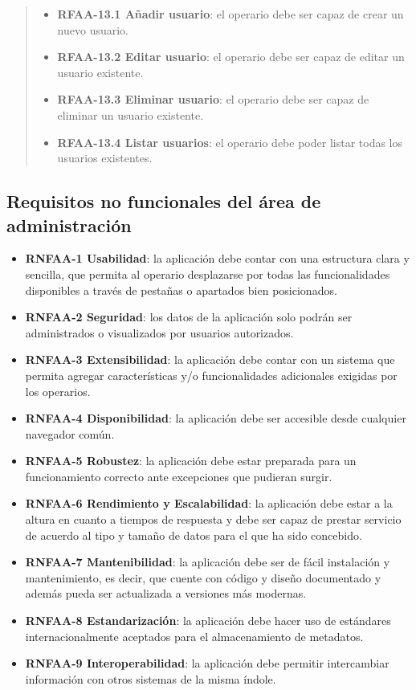 \begin{itemize}
  \begin{quote}
  \begin{itemize}
  \tightlist
  \item
    \textbf{RFAA-13.1 Añadir usuario}: el operario debe ser capaz de
    crear un nuevo usuario.
  \item
    \textbf{RFAA-13.2 Editar usuario}: el operario debe ser capaz de
    editar un usuario existente.
  \item
    \textbf{RFAA-13.3 Eliminar usuario}: el operario debe ser capaz de
    eliminar un usuario existente.
  \item
    \textbf{RFAA-13.4 Listar usuarios}: el operario debe poder listar
    todas los usuarios existentes.
  \end{itemize}
  \end{quote}
\end{itemize}

\subsection{Requisitos no funcionales del área de administración}

\begin{itemize}
\tightlist
\item
  \textbf{RNFAA-1 Usabilidad}: la aplicación debe contar con una
  estructura clara y sencilla, que permita al operario desplazarse por
  todas las funcionalidades disponibles a través de pestañas o apartados
  bien posicionados.
\item
  \textbf{RNFAA-2 Seguridad}: los datos de la aplicación solo podrán ser
  administrados o visualizados por usuarios autorizados.
\item
  \textbf{RNFAA-3 Extensibilidad}: la aplicación debe contar con un
  sistema que permita agregar características y/o funcionalidades
  adicionales exigidas por los operarios.
\item
  \textbf{RNFAA-4 Disponibilidad}: la aplicación debe ser accesible
  desde cualquier navegador común.
\item
  \textbf{RNFAA-5 Robustez}: la aplicación debe estar preparada para un
  funcionamiento correcto ante excepciones que pudieran surgir.
\item
  \textbf{RNFAA-6 Rendimiento y Escalabilidad}: la aplicación debe estar
  a la altura en cuanto a tiempos de respuesta y debe ser capaz de
  prestar servicio de acuerdo al tipo y tamaño de datos para el que ha
  sido concebido.
\item
  \textbf{RNFAA-7 Mantenibilidad}: la aplicación debe ser de fácil
  instalación y mantenimiento, es decir, que cuente con código y diseño
  documentado y además pueda ser actualizada a versiones más modernas.
\item
  \textbf{RNFAA-8 Estandarización}: la aplicación debe hacer uso de
  estándares internacionalmente aceptados para el almacenamiento de
  metadatos.
\item
  \textbf{RNFAA-9 Interoperabilidad}: la aplicación debe permitir
  intercambiar información con otros sistemas de la misma índole.
\end{itemize}


